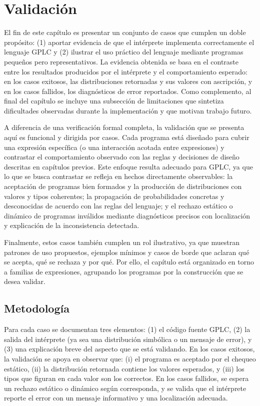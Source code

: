 
\chapter{Validación}\label{sec:validacion}



El fin de este capítulo es presentar un conjunto de casos que cumplen
un doble propósito: {(1)} aportar evidencia de que el intérprete
implementa correctamente el lenguaje GPLC y {(2)}  ilustrar el
uso práctico del lenguaje mediante programas pequeños pero
representativos.  La evidencia obtenida se basa en el contraste entre
los resultados producidos por el intérprete y el comportamiento
esperado: en los casos exitosos, las distribuciones retornadas y sus
valores con ascripción, y en los casos fallidos, los diagnósticos de
error reportados. Como complemento, al final del capítulo se incluye
una subsección de limitaciones que sintetiza dificultades observadas
durante la implementación y que motivan trabajo futuro.

A diferencia de una verificación formal completa, la validación que se
presenta aquí es funcional y dirigida por casos.  Cada programa está
diseñado para cubrir una expresión específica (o una interacción
acotada entre expresiones) y contrastar el comportamiento observado
con las reglas y decisiones de diseño descritas en capítulos previos.
Este enfoque resulta adecuado para GPLC, ya que lo que se busca
contrastar se refleja en hechos directamente observables: la
aceptación de programas bien formados y la producción de
distribuciones con valores y tipos coherentes; la propagación de
probabilidades concretas y desconocidas de acuerdo con las reglas del
lenguaje; y el rechazo estático o dinámico de programas inválidos
mediante diagnósticos precisos con localización y explicación de la
inconsistencia detectada.

Finalmente, estos casos también cumplen un rol ilustrativo, ya que
muestran patrones de uso propuestos, ejemplos mínimos y casos de borde
que aclaran qué se acepta, qué se rechaza y por qué. Por ello, el
capítulo está organizado en torno a familias de expresiones, agrupando
los programas por la construcción que se desea validar.


\section{Metodología}

Para cada caso se documentan tres elementos: {(1)} el código
fuente GPLC, {(2)} la salida del intérprete (ya sea una
distribución simbólica o un mensaje de error), y {(3)} una
explicación breve del aspecto que se está validando. En los casos
exitosos, la validación se apoya en observar que: {(i)} el
programa es aceptado por el chequeo estático, {(ii)} la
distribución retornada contiene los valores esperados, y
{(iii)} los tipos que figuran en cada valor son los
correctos. En los casos fallidos, se espera un rechazo estático o
dinámico según corresponda, y se valida que el intérprete reporte el
error con un mensaje informativo y una localización adecuada.

